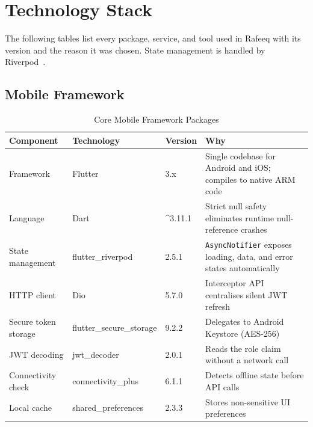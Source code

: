 \documentclass[12pt,a4paper]{report}
\begin{document}
\section{Technology Stack}

The following tables list every package, service, and tool used in Rafeeq with its version and the reason it was chosen. State management is handled by Riverpod~\cite{riverpod}.

\subsection{Mobile Framework}

\begin{table}[H]
\centering
\caption{Core Mobile Framework Packages}
\label{tab:core_stack}
\begin{tabularx}{\textwidth}{@{}lXlX@{}}
\toprule
\textbf{Component}   & \textbf{Technology}          & \textbf{Version} & \textbf{Why} \\
\midrule
Framework            & Flutter                      & 3.x              & Single codebase for Android and iOS; compiles to native ARM code \\
Language             & Dart                         & \textasciicircum3.11.1 & Strict null safety eliminates runtime null-reference crashes \\
State management     & flutter\_riverpod            & 2.5.1            & \texttt{AsyncNotifier} exposes loading, data, and error states automatically \\
HTTP client          & Dio                          & 5.7.0            & Interceptor API centralises silent JWT refresh \\
Secure token storage & flutter\_secure\_storage     & 9.2.2            & Delegates to Android Keystore (AES-256) \\
JWT decoding         & jwt\_decoder                 & 2.0.1            & Reads the role claim without a network call \\
Connectivity check   & connectivity\_plus           & 6.1.1            & Detects offline state before API calls \\
Local cache          & shared\_preferences          & 2.3.3            & Stores non-sensitive UI preferences \\
\bottomrule
\end{tabularx}
\end{table}
\end{document}
